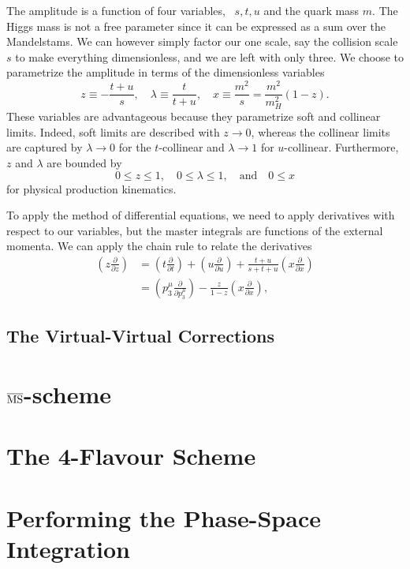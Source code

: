 The amplitude is a function of four variables, \eg\ $s, t, u$ and the quark mass $m$. The Higgs mass is not a free parameter since it can be expressed as a sum over the Mandelstams. We can however simply factor our one scale, say the collision scale $s$ to make everything dimensionless, and we are left with only three. We choose to parametrize the amplitude in terms of the dimensionless variables
\begin{equation}
z \equiv - \frac{t + u}{s}, \quad \lambda \equiv \frac{t}{t + u}, \quad x \equiv \frac{m^2}{s} = \frac{m^2}{m_H^2} (1 - z).
\end{equation}
These variables are advantageous because they parametrize soft and collinear limits. Indeed, soft limits are described with $z \rightarrow 0$, whereas the collinear limits are captured by $\lambda \rightarrow 0$ for the $t$-collinear and $\lambda \rightarrow 1$ for $u$-collinear. Furthermore, $z$ and $\lambda$ are bounded by
\begin{equation}
0 \le z \le 1, \quad 0 \le \lambda \le 1, \quad \text{and} \quad 0 \le x
\end{equation}
for physical production kinematics.

To apply the method of differential equations, we need to apply derivatives with respect to our variables, but the master integrals are functions of the external momenta. We can apply the chain rule to relate the derivatives
\begin{equation}
\begin{split}
\left(z \frac{\partial }{\partial z} \right) &= \left(t \frac{\partial }{ \partial t} \right) + \left( u \frac{\partial}{ \partial u} \right) + \frac{t + u}{s + t + u} \left(x \frac{\partial}{ \partial x} \right) \\
&= \left(p_3^\mu \frac{\partial}{\partial p_3^\mu} \right) - \frac{z}{1 - z} \left(x \frac{\partial }{\partial x} \right),
\end{split}
\end{equation}


\subsection{The Virtual-Virtual Corrections}
\section{\texorpdfstring{$\overline{\mathrm{MS}}$}{MS}-scheme}
\section{The 4-Flavour Scheme}\label{sec:5:4FS}
\section{Performing the Phase-Space Integration}


